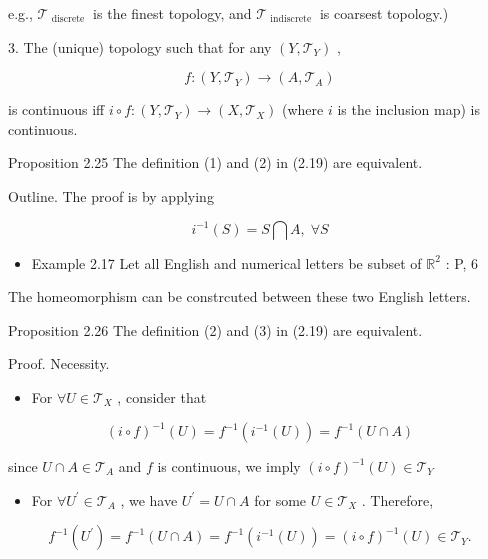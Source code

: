 e.g., \({\mathcal{T}}_{\text{ discrete }}\) is the finest topology, and \({\mathcal{T}}_{\text{ indiscrete }}\) is coarsest topology.)

3. The (unique) topology such that for any \(\left( {Y,{\mathcal{T}}_{Y}}\right)\) ,

\[
f : \left( {Y,{\mathcal{T}}_{Y}}\right)  \rightarrow  \left( {A,{\mathcal{T}}_{A}}\right)
\]

is continuous iff \(i \circ  f : \left( {Y,{\mathcal{T}}_{Y}}\right)  \rightarrow  \left( {X,{\mathcal{T}}_{X}}\right)\) (where \(i\) is the inclusion map) is continuous.

Proposition 2.25 The definition (1) and (2) in (2.19) are equivalent.

Outline. The proof is by applying

\[
{i}^{-1}\left( S\right)  = S\bigcap A,\;\forall S
\]

\begin{itemize}
\item Example 2.17 Let all English and numerical letters be subset of \({\mathbb{R}}^{2}\) : P, 6
\end{itemize}

The homeomorphism can be constrcuted between these two English letters.

Proposition 2.26 The definition (2) and (3) in (2.19) are equivalent.

Proof. Necessity.

\begin{itemize}
\item For \(\forall U \in  {\mathcal{T}}_{X}\) , consider that
\end{itemize}

\[
{\left( i \circ  f\right) }^{-1}\left( U\right)  = {f}^{-1}\left( {{i}^{-1}\left( U\right) }\right)  = {f}^{-1}\left( {U \cap  A}\right)
\]

since \(U \cap  A \in  {\mathcal{T}}_{A}\) and \(f\) is continuous, we imply \({\left( i \circ  f\right) }^{-1}\left( U\right)  \in  {\mathcal{T}}_{Y}\)

\begin{itemize}
\item For \(\forall {U}^{\prime } \in  {\mathcal{T}}_{A}\) , we have \({U}^{\prime } = U \cap  A\) for some \(U \in  {\mathcal{T}}_{X}\) . Therefore,
\end{itemize}

\[
{f}^{-1}\left( {U}^{\prime }\right)  = {f}^{-1}\left( {U \cap  A}\right)  = {f}^{-1}\left( {{i}^{-1}\left( U\right) }\right)  = {\left( i \circ  f\right) }^{-1}\left( U\right)  \in  {\mathcal{T}}_{Y}.
\]

